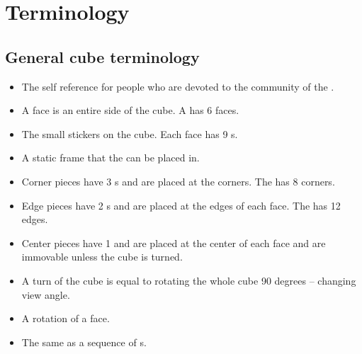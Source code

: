 \chapter{Terminology}
\section{General cube terminology}
\label{sec:generalNotation}
\begin{itemize}
\item {}The self reference for people who are devoted to the community of the \rubik{}. 
\item {}A face is an entire side of the cube. A \rubik{} has 6 faces.
\item {}The small stickers on the cube. Each face has 9 \facet{}s.
\item \myTermHigh{\cubicle{}} A static frame that the \cpiece{} can be placed in.
\item {}Corner pieces have 3 \facet{}s and are placed at the corners. The \rubik{} has 8 corners. 
\item {}Edge pieces have 2 \facet{}s and are placed at the edges of each face. The \rubik{} has 12 edges.
\item {}Center pieces have 1 \facet{} and are placed at the center of each face and are immovable unless the cube is turned. 
\item {}A turn of the cube is equal to rotating the whole cube 90 degrees -- changing view angle.
\item {}A rotation of a face.%
\item {} The same as a sequence of \twist{}s.
\end{itemize}

